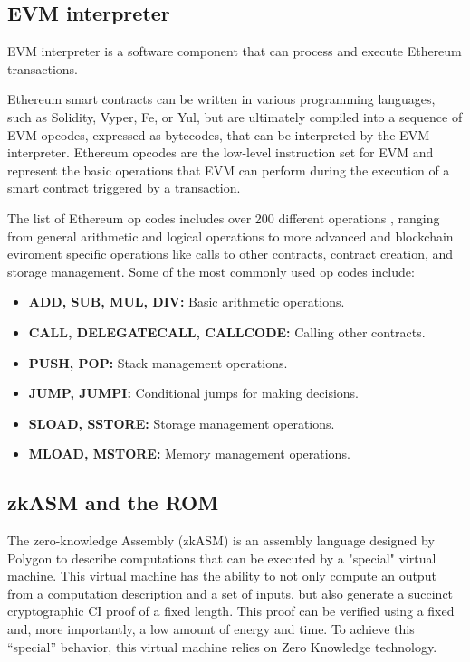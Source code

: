\subsection{EVM interpreter}

EVM interpreter is a software component that can process and execute Ethereum transactions. 

Ethereum smart contracts can be written in various programming languages, such as Solidity, Vyper, Fe, or Yul, but are ultimately compiled into a sequence of EVM opcodes, expressed as bytecodes, that can be interpreted by the EVM interpreter. Ethereum opcodes are the low-level instruction set for EVM and represent the basic operations that EVM can perform during the execution of a smart contract triggered by a transaction.

The list of Ethereum op codes includes over 200 different operations , ranging from general arithmetic and logical operations to more advanced and blockchain eviroment specific operations like calls to other contracts, contract creation, and storage management. Some of the most commonly used op codes include:

\begin{itemize}
\item \textbf{ADD, SUB, MUL, DIV:} Basic arithmetic operations.
\item \textbf{CALL, DELEGATECALL, CALLCODE:} Calling other contracts.
\item \textbf{PUSH, POP:} Stack management operations.
\item \textbf{JUMP, JUMPI:} Conditional jumps for making decisions.
\item \textbf{SLOAD, SSTORE:} Storage management operations.
\item \textbf{MLOAD, MSTORE:} Memory management operations.
\end{itemize}

\subsection{zkASM and the ROM}
The zero-knowledge Assembly (zkASM) is an assembly language designed by Polygon to describe computations that can be executed by a "special" virtual machine. This virtual machine has the ability to not only compute an output from a computation description and a set of inputs, but also generate a succinct cryptographic CI proof of a fixed length. This proof can be verified using a fixed and, more importantly, a low amount of energy and time. To achieve this “special” behavior, this virtual machine relies on Zero Knowledge technology. 

